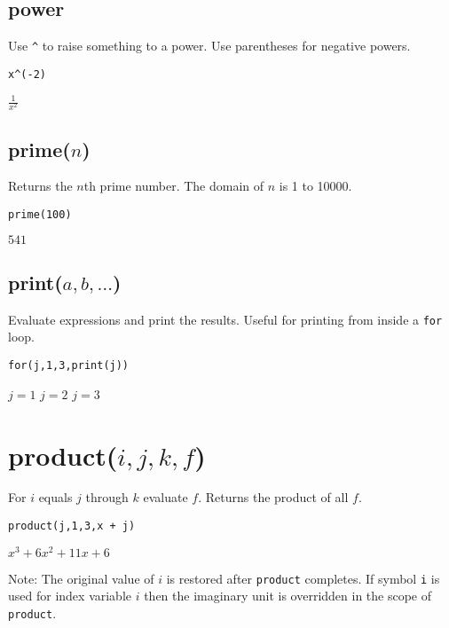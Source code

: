 \subsection*{power}

Use \verb$^$ to raise something to a power.
Use parentheses for negative powers.

{\color{blue}
\begin{verbatim}
x^(-2)
\end{verbatim}
}

\noindent
$\displaystyle \frac{1}{x^2}$

\subsection*{prime($n$)}

Returns the $n$th prime number.
The domain of $n$ is 1 to 10000.
{\color{blue}
\begin{verbatim}
prime(100)
\end{verbatim}
}

\noindent
$541$

\subsection*{print($a,b,\ldots$)}

Evaluate expressions and print the results.
Useful for printing from inside a {\tt for} loop.

{\color{blue}
\begin{verbatim}
for(j,1,3,print(j))
\end{verbatim}
}

\noindent
$j=1$\newline
$j=2$\newline
$j=3$

\section*{product($i,j,k,f$)}

For $i$ equals $j$ through $k$ evaluate $f$.
Returns the product of all $f$.

{\color{blue}
\begin{verbatim}
product(j,1,3,x + j)
\end{verbatim}
}

\noindent
$\displaystyle x^3+6x^2+11x+6$

\bigskip
\noindent
Note: The original value of $i$ is restored after {\tt product} completes.
If symbol {\tt i} is used for index variable $i$
then the imaginary unit is overridden in the scope of {\tt product}.

